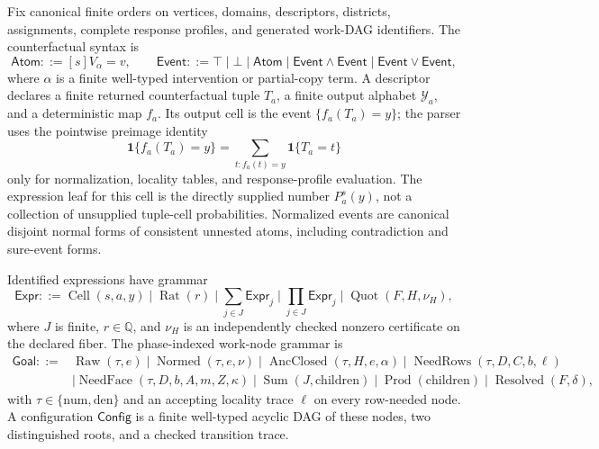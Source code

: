 Fix canonical finite orders on vertices, domains, descriptors, districts, assignments, complete response profiles, and generated work-DAG identifiers.  The counterfactual syntax is
\[
\mathsf{Atom}::=[s]V_\alpha=v,
\qquad
\mathsf{Event}::=\top\mid\bot\mid\mathsf{Atom}
\mid\mathsf{Event}\wedge\mathsf{Event}
\mid\mathsf{Event}\vee\mathsf{Event},
\]
where \(\alpha\) is a finite well-typed intervention or partial-copy term.  A descriptor declares a finite returned counterfactual tuple \(T_a\), a finite output alphabet \(\mathcal Y_a\), and a deterministic map \(f_a\).  Its output cell is the event \(\{f_a(T_a)=y\}\); the parser uses the pointwise preimage identity
\[
\mathbf 1\{f_a(T_a)=y\}
=\sum_{t:f_a(t)=y}\mathbf 1\{T_a=t\}
\tag{1}
\]
only for normalization, locality tables, and response-profile evaluation.  The expression leaf for this cell is the directly supplied number \(P_a^s(y)\), not a collection of unsupplied tuple-cell probabilities.  Normalized events are canonical disjoint normal forms of consistent unnested atoms, including contradiction and sure-event forms.

Identified expressions have grammar
\[
\mathsf{Expr}::=
\operatorname{Cell}(s,a,y)\mid\operatorname{Rat}(r)
\mid\sum_{j\in J}\mathsf{Expr}_j
\mid\prod_{j\in J}\mathsf{Expr}_j
\mid\operatorname{Quot}(F,H,\nu_H),
\]
where \(J\) is finite, \(r\in\mathbb Q\), and \(\nu_H\) is an independently checked nonzero certificate on the declared fiber.  The phase-indexed work-node grammar is
\[
\begin{split}
\mathsf{Goal}::={}&
\operatorname{Raw}(\tau,e)
\mid\operatorname{Normed}(\tau,e,\nu)
\mid\operatorname{AncClosed}(\tau,H,e,\alpha)
\mid\operatorname{NeedRows}(\tau,D,C,b,\ell)\\
&\mid\operatorname{NeedFace}(\tau,D,b,A,m,Z,\kappa)
\mid\operatorname{Sum}(J,\mathrm{children})
\mid\operatorname{Prod}(\mathrm{children})
\mid\operatorname{Resolved}(F,\delta),
\end{split}
\]
with \(\tau\in\{\mathrm{num},\mathrm{den}\}\) and an accepting locality trace \(\ell\) on every row-needed node.  A configuration \(\mathsf{Config}\) is a finite well-typed acyclic DAG of these nodes, two distinguished roots, and a checked transition trace.

